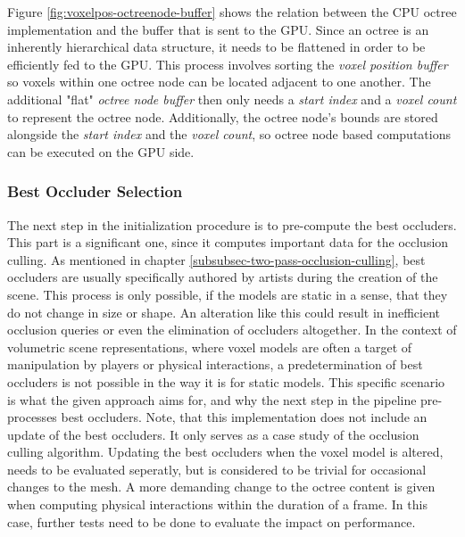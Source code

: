 \noindent
Figure \ref{fig:voxelpos-octreenode-buffer} shows the relation between the \ac{CPU} octree implementation and the buffer 
that is sent to the \ac{GPU}. Since an octree is an inherently hierarchical data structure, it needs to be flattened in 
order to be efficiently fed to the \ac{GPU}. This process involves sorting the \emph{voxel position buffer} so voxels 
within one octree node can be located adjacent to one another. The additional "flat" \emph{octree node buffer} then only 
needs a \emph{start index} and a \emph{voxel count} to represent the octree node. Additionally, the octree node's bounds 
are stored alongside the \emph{start index} and the \emph{voxel count}, so octree node based computations can be executed 
on the \ac{GPU} side. \\


\subsubsection*{Best Occluder Selection} \label{subsec-best-occluder-selection}

The next step in the initialization procedure is to pre-compute the best occluders. This part is a significant one, 
since it computes important data for the occlusion culling. As mentioned in chapter \ref{subsubsec-two-pass-occlusion-culling},
best occluders are usually specifically authored by artists during the creation of the scene. This process is only 
possible, if the models are static in a sense, that they do not change in size or shape. An alteration like this 
could result in inefficient occlusion queries or even the elimination of occluders altogether. In the context of 
volumetric scene representations, where voxel models are often a target of manipulation by players or physical 
interactions, a predetermination of best occluders is not possible in the way it is for static models.
This specific scenario is what the given approach aims for, and why the next step in the pipeline pre-processes best 
occluders. Note, that this implementation does not include an update of the best occluders. It only serves as a 
case study of the occlusion culling algorithm. Updating the best occluders when the voxel model is altered, 
needs to be evaluated seperatly, but is considered to be trivial for occasional changes to the mesh. A more 
demanding change to the octree content is given when computing physical interactions within the duration of a frame.
In this case, further tests need to be done to evaluate the impact on performance. \\


